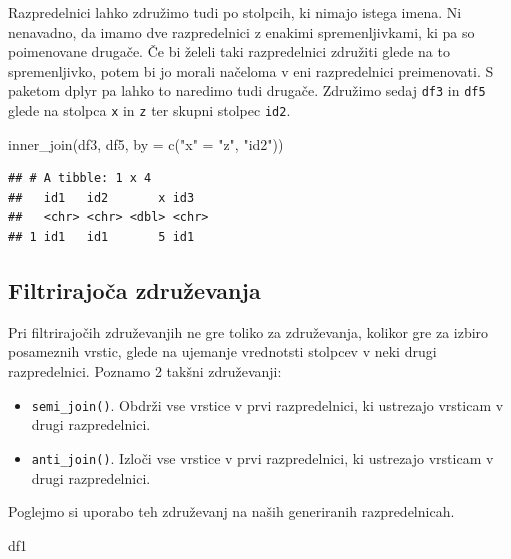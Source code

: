 \documentclass[
]{book}
\newenvironment{Shaded}{\begin{snugshade}}{\end{snugshade}}
\newcommand{\AttributeTok}[1]{\textcolor[rgb]{0.77,0.63,0.00}{#1}}
\newcommand{\FunctionTok}[1]{\textcolor[rgb]{0.00,0.00,0.00}{#1}}
\newcommand{\NormalTok}[1]{#1}
\newcommand{\OtherTok}[1]{\textcolor[rgb]{0.56,0.35,0.01}{#1}}
\newcommand{\StringTok}[1]{\textcolor[rgb]{0.31,0.60,0.02}{#1}}
\providecommand{\tightlist}{%
  \setlength{\itemsep}{0pt}\setlength{\parskip}{0pt}}
\begin{document}
Razpredelnici lahko združimo tudi po stolpcih, ki nimajo istega imena. Ni nenavadno, da imamo dve razpredelnici z enakimi spremenljivkami, ki pa so poimenovane drugače. Če bi želeli taki razpredelnici združiti glede na to spremenljivko, potem bi jo morali načeloma v eni razpredelnici preimenovati. S paketom dplyr pa lahko to naredimo tudi drugače. Združimo sedaj \texttt{df3} in \texttt{df5} glede na stolpca \texttt{x} in \texttt{z} ter skupni stolpec \texttt{id2}.

\begin{Shaded}
\begin{Highlighting}[]
\FunctionTok{inner\_join}\NormalTok{(df3, df5, }\AttributeTok{by =} \FunctionTok{c}\NormalTok{(}\StringTok{"x"} \OtherTok{=} \StringTok{"z"}\NormalTok{, }\StringTok{"id2"}\NormalTok{))}
\end{Highlighting}
\end{Shaded}

\begin{verbatim}
## # A tibble: 1 x 4
##   id1   id2       x id3  
##   <chr> <chr> <dbl> <chr>
## 1 id1   id1       5 id1
\end{verbatim}

\hypertarget{filtrirajoux10da-zdruux17eevanja}{%
\subsection{Filtrirajoča združevanja}\label{filtrirajoux10da-zdruux17eevanja}}

Pri filtrirajočih združevanjih ne gre toliko za združevanja, kolikor gre za izbiro posameznih vrstic, glede na ujemanje vrednotsti stolpcev v neki drugi razpredelnici. Poznamo 2 takšni združevanji:

\begin{itemize}
\tightlist
\item
  \texttt{semi\_join()}. Obdrži vse vrstice v prvi razpredelnici, ki ustrezajo vrsticam v drugi razpredelnici.
\item
  \texttt{anti\_join()}. Izloči vse vrstice v prvi razpredelnici, ki ustrezajo vrsticam v drugi razpredelnici.
\end{itemize}

Poglejmo si uporabo teh združevanj na naših generiranih razpredelnicah.

\begin{Shaded}
\begin{Highlighting}[]
\NormalTok{df1}
\end{Highlighting}
\end{Shaded}
\end{document}
